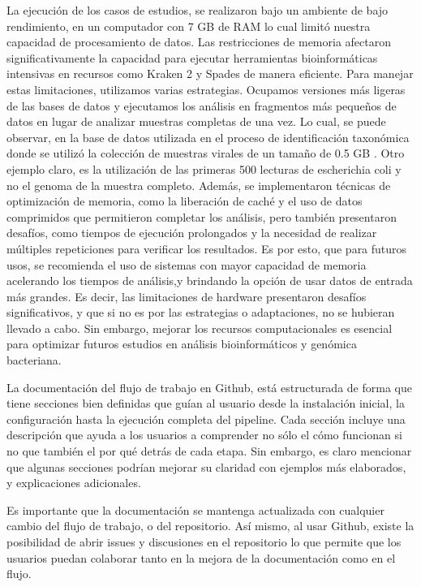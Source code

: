 \documentclass[12pt]{article}
\begin{document}
	
La ejecución de los casos de estudios, se realizaron bajo un ambiente de bajo rendimiento, en un computador con 7 GB de RAM lo cual limitó nuestra capacidad de procesamiento de datos. Las restricciones de memoria afectaron significativamente la capacidad para ejecutar herramientas bioinformáticas intensivas en recursos como Kraken 2 y Spades de manera eficiente. Para manejar estas limitaciones, utilizamos varias estrategias. Ocupamos versiones más ligeras de las bases de datos y ejecutamos los análisis en fragmentos más pequeños de datos en lugar de analizar muestras completas de una vez. Lo cual, se puede observar, en la base de datos utilizada en el proceso de identificación taxonómica donde se utilizó la colección de muestras virales de un tamaño de 0.5 GB . Otro ejemplo claro, es la utilización de las primeras 500 lecturas de escherichia coli y no el genoma de la muestra completo. Además, se implementaron técnicas de optimización de memoria, como la liberación de caché y el uso de datos comprimidos que permitieron completar los análisis, pero también presentaron desafíos, como tiempos de ejecución prolongados y la necesidad de realizar múltiples repeticiones para verificar los resultados. Es por esto, que para futuros usos, se recomienda el uso de sistemas con mayor capacidad de memoria acelerando los tiempos de análisis,y brindando la opción de usar datos de entrada más grandes. Es decir, las limitaciones de hardware presentaron desafíos significativos, y que si no es por las estrategias o adaptaciones, no se hubieran llevado a cabo. Sin embargo, mejorar los recursos computacionales es esencial para optimizar futuros estudios en análisis bioinformáticos y genómica bacteriana.

La documentación del flujo de trabajo en Github, está estructurada de forma que tiene secciones bien definidas que guían al usuario desde la instalación inicial, la configuración hasta la ejecución completa del pipeline. Cada sección incluye una descripción que ayuda a los usuarios a comprender no sólo el cómo funcionan si no que también el por qué detrás de cada etapa. Sin embargo, es claro mencionar que algunas secciones podrían mejorar su claridad con ejemplos más elaborados, y explicaciones adicionales.
	
Es importante que la documentación se mantenga actualizada con cualquier cambio del flujo de trabajo, o del repositorio. Así mismo, al usar Github, existe la posibilidad de abrir issues y discusiones en el repositorio lo que permite que los usuarios puedan colaborar tanto en la mejora de la documentación como en el flujo.
\end{document}
